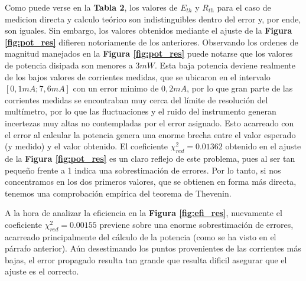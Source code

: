 \documentclass[11pt,a4paper]{article}
\begin{document}
Como puede verse en la \textbf{Tabla 2}, los valores de $E_{th}$ y $R_{th}$ para el caso de medicion directa y calculo teórico son indistinguibles dentro del error y, por ende, son iguales. Sin embargo, los valores obtenidos mediante el ajuste de la \textbf{Figura \ref{fig:pot_res}} difieren notoriamente de los anteriores. Observando los ordenes de magnitud manejados en la \textbf{Figura \ref{fig:pot_res}} puede notarse que los valores de potencia disipada son menores a $3mW$. Esta baja potencia deviene realmente de los bajos valores de corrientes medidas, que se ubicaron en el intervalo $[0,1mA;7,6mA]$ con un error minimo de $0,2mA$, por lo que gran parte de las corrientes medidas se encontraban muy cerca del límite de resolución del multímetro, por lo que las fluctuaciones y el ruido del instrumento generan incertezas muy altas no contempladas por el error asignado. Esto acarreado con el error al calcular la potencia genera una enorme brecha entre el valor esperado (y medido) y el valor obtenido. El coeficiente $\chi_{red}^{2} = 0.01362$ obtenido en el ajuste de la \textbf{Figura \ref{fig:pot_res}} es un claro reflejo de este problema, pues al ser tan pequeño frente a 1 indica una sobrestimación de errores. Por lo tanto, si nos concentramos en los dos primeros valores, que se obtienen en forma más directa, tenemos una comprobación empírica del teorema de Thevenin. 

A la hora de analizar la eficiencia en la \textbf{Figura \ref{fig:efi_res}}, nuevamente el coeficiente $\chi_{red}^{2} = 0.00155$ previene sobre una enorme sobrestimación de errores, acarreado principalmente del cálculo de la potencia (como se ha visto en el párrafo anterior). Aún desestimando los puntos provenientes de las corrientes más bajas, el error propagado resulta tan grande que resulta dificil asegurar que el ajuste es el correcto. 






 
\end{document}
